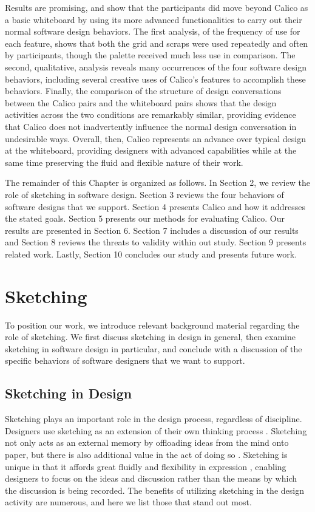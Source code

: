 Results are promising, and show that the participants did move beyond Calico as a basic whiteboard by using its more advanced functionalities to carry out their normal software design behaviors. The first analysis, of the frequency of use for each feature, shows that both the grid and scraps were used repeatedly and often by participants, though the palette received much less use in comparison. The second, qualitative, analysis reveals many occurrences of the four software design behaviors, including several creative uses of Calico's features to accomplish these behaviors. Finally, the comparison of the structure of design conversations between the Calico pairs and the whiteboard pairs shows that the design activities across the two conditions are remarkably similar, providing evidence that Calico does not inadvertently influence the normal design conversation in undesirable ways. Overall, then, Calico represents an advance over typical design at the whiteboard, providing designers with advanced capabilities while at the same time preserving the fluid and flexible nature of their work.

The remainder of this Chapter is organized as follows. In Section 2, we review the role of sketching in software design. Section 3 reviews the four behaviors of software designs that we support. Section 4 presents Calico and how it addresses the stated goals. Section 5 presents our methods for evaluating Calico. Our results are presented in Section 6. Section 7 includes a discussion of our results and Section 8 reviews the threats to validity within out study. Section 9 presents related work. Lastly, Section 10 concludes our study and presents future work.

\section{Sketching}
\label{sketching}
To position our work, we introduce relevant background material regarding the role of sketching. We first discuss sketching in design in general, then examine sketching in software design in particular, and conclude with a discussion of the specific behaviors of software designers that we want to support.

\subsection{Sketching in Design}
\label{sketching:1}
Sketching plays an important role in the design process, regardless of discipline. Designers use sketching as an extension of their own thinking process \citep{petre2009insights,lawson1994design}. Sketching not only acts as an external memory \citep{Newell} by offloading ideas from the mind onto paper, but there is also additional value in the act of doing so \citep{Schutze}. Sketching is unique in that it affords great fluidly and flexibility in expression \citep{Csikszentmihalyi}, enabling designers to focus on the ideas and discussion rather than the means by which the discussion is being recorded. The benefits of utilizing sketching in the design activity are numerous, and here we list those that stand out most.

